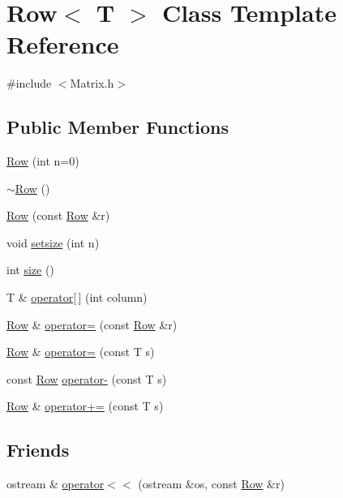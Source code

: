 \hypertarget{classRow}{
\section{Row$<$ T $>$ Class Template Reference}
\label{classRow}
}


{\ttfamily \#include $<$Matrix.h$>$}

\subsection*{Public Member Functions}
\begin{DoxyCompactItemize}
\item 
\hyperlink{classRow_aad13a5275c04ed243620bb02164806a1}{Row} (int n=0)
\item 
\hyperlink{classRow_a8e888a33060156cd2e3757a95e9feee1}{$\sim$Row} ()
\item 
\hyperlink{classRow_a3c76905ddd4522c92da0d8a9e24a22a1}{Row} (const \hyperlink{classRow}{Row} \&r)
\item 
void \hyperlink{classRow_aebdf0fa4ce1946b8d9ef3c6f266edb7d}{setsize} (int n)
\item 
int \hyperlink{classRow_ac3239fe892db0029206a7e0d888595d1}{size} ()
\item 
T \& \hyperlink{classRow_a7f371e29268ff2a5e508b32229250d8d}{operator\mbox{[}$\,$\mbox{]}} (int column)
\item 
\hyperlink{classRow}{Row} \& \hyperlink{classRow_a877484e061eef2a179cc28d30b3ec542}{operator=} (const \hyperlink{classRow}{Row} \&r)
\item 
\hyperlink{classRow}{Row} \& \hyperlink{classRow_a1511d921c037da716d3ca7b6da79ab94}{operator=} (const T s)
\item 
const \hyperlink{classRow}{Row} \hyperlink{classRow_a0f6c09f74d0ab002c9af9ad0dfd89399}{operator-\/} (const T s)
\item 
\hyperlink{classRow}{Row} \& \hyperlink{classRow_a46ffce8561e1869e2a4d3a7ac107469b}{operator+=} (const T s)
\end{DoxyCompactItemize}
\subsection*{Friends}
\begin{DoxyCompactItemize}
\item 
ostream \& \hyperlink{classRow_a8aaaee73ace04bfd4dda937bc311a16e}{operator$<$$<$} (ostream \&os, const \hyperlink{classRow}{Row} \&r)
\end{DoxyCompactItemize}


